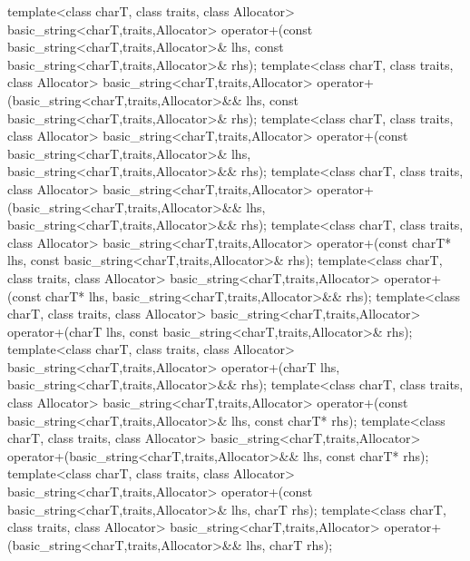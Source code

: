 \begin{codeblock}
{  template<class charT, class traits, class Allocator>
    basic_string<charT,traits,Allocator>
      operator+(const basic_string<charT,traits,Allocator>& lhs,
                const basic_string<charT,traits,Allocator>& rhs);
  template<class charT, class traits, class Allocator>
    basic_string<charT,traits,Allocator>
      operator+(basic_string<charT,traits,Allocator>&& lhs,
                const basic_string<charT,traits,Allocator>& rhs);
  template<class charT, class traits, class Allocator>
    basic_string<charT,traits,Allocator>
      operator+(const basic_string<charT,traits,Allocator>& lhs,
                basic_string<charT,traits,Allocator>&& rhs);
  template<class charT, class traits, class Allocator>
    basic_string<charT,traits,Allocator>
      operator+(basic_string<charT,traits,Allocator>&& lhs,
                basic_string<charT,traits,Allocator>&& rhs);
  template<class charT, class traits, class Allocator>
    basic_string<charT,traits,Allocator>
      operator+(const charT* lhs,
                const basic_string<charT,traits,Allocator>& rhs);
  template<class charT, class traits, class Allocator>
    basic_string<charT,traits,Allocator>
      operator+(const charT* lhs,
                basic_string<charT,traits,Allocator>&& rhs);
  template<class charT, class traits, class Allocator>
    basic_string<charT,traits,Allocator>
      operator+(charT lhs, const basic_string<charT,traits,Allocator>& rhs);
  template<class charT, class traits, class Allocator>
    basic_string<charT,traits,Allocator>
      operator+(charT lhs, basic_string<charT,traits,Allocator>&& rhs);
  template<class charT, class traits, class Allocator>
    basic_string<charT,traits,Allocator>
      operator+(const basic_string<charT,traits,Allocator>& lhs,
                const charT* rhs);
  template<class charT, class traits, class Allocator>
    basic_string<charT,traits,Allocator>
      operator+(basic_string<charT,traits,Allocator>&& lhs,
                const charT* rhs);
  template<class charT, class traits, class Allocator>
    basic_string<charT,traits,Allocator>
      operator+(const basic_string<charT,traits,Allocator>& lhs, charT rhs);
  template<class charT, class traits, class Allocator>
    basic_string<charT,traits,Allocator>
      operator+(basic_string<charT,traits,Allocator>&& lhs, charT rhs);

}
\end{codeblock}

